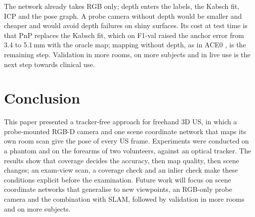 \documentclass[9pt,shortpaper,twoside,web]{ieeecolor2}
\newcommand{\Fval}{F1-val}
\begin{document}
The network already takes RGB only; depth enters the labels, the Kabsch fit, ICP and the pose graph. A probe camera without depth would be smaller and cheaper and would avoid depth failures on shiny surfaces. Its cost at test time is that PnP replaces the Kabsch fit, which on \Fval{} raised the anchor error from 3.4 to 5.1\,mm with the oracle map; mapping without depth, as in ACE0 \cite{brachmann2024ace0}, is the remaining step. Validation in more rooms, on more subjects and in live use is the next step towards clinical use.


\section{Conclusion}
\label{sec:conclusion}
This paper presented a tracker-free approach for freehand 3D US, in which a probe-mounted RGB-D camera and one scene coordinate network that maps its own room scan give the pose of every US frame. Experiments were conducted on a phantom and on the forearms of two volunteers, against an optical tracker. The results show that coverage decides the accuracy, then map quality, then scene changes; an exam-view scan, a coverage check and an inlier check make these conditions explicit before the examination. Future work will focus on scene coordinate networks that generalise to new viewpoints, an RGB-only probe camera and the combination with SLAM, followed by validation in more rooms and on more subjects.







\end{document}
